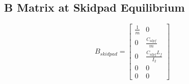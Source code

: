 \documentclass{article}
\begin{document}
\subsection*{B Matrix at Skidpad Equilibrium}
\begin{equation}
B_{skidpad} = \left[\begin{matrix}\frac{1}{m} & 0\\0 & \frac{C_{alp f}}{m}\\0 & \frac{C_{alp f} L_{f}}{I_{2}}\\0 & 0\\0 & 0\end{matrix}\right]
\end{equation}
\end{document}
